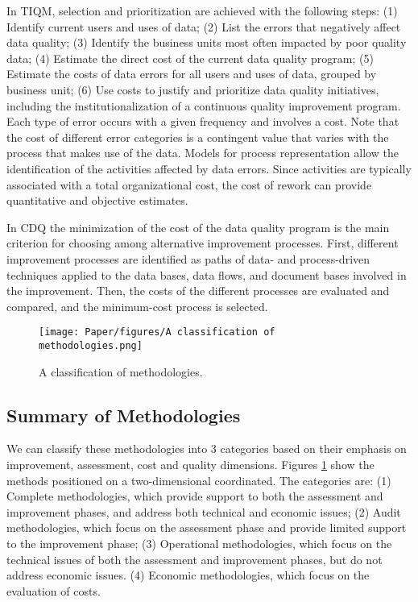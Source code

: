 \documentclass[pdftex,english,oribibl]{llncs}
\begin{document}
In TIQM, selection and prioritization are achieved with the following steps:
(1) Identify current users and uses of data;
(2) List the errors that negatively affect data quality;
(3) Identify the business units most often impacted by poor quality data;
(4) Estimate the direct cost of the current data quality program;
(5) Estimate the costs of data errors for all users and uses of data, grouped by business unit;
(6) Use costs to justify and prioritize data quality initiatives, including the institutionalization of a continuous quality improvement program.
Each type of error occurs with a given frequency and involves a cost. Note that the cost of different error categories is a contingent value that varies with the process that makes use of the data. Models for process representation allow the identification of the activities affected by data errors. Since activities are typically associated with a total organizational cost, the cost of rework can provide quantitative and objective estimates.

In CDQ the minimization of the cost of the data quality program is the main criterion for choosing among alternative improvement processes. First, different improvement processes are identified as paths of data- and process-driven techniques applied to the data bases, data flows, and document bases involved in the improvement. Then, the costs of the different processes are evaluated and compared, and the minimum-cost
process is selected.


  \begin{figure}
    \centering
    \texttt{[image: Paper/figures/A classification of methodologies.png]}
    \caption{A classification of methodologies.}
    \label{fig:classificationMethodologies}
  \end{figure}

\subsection{Summary of Methodologies}
We can classify these methodologies into 3 categories based on their emphasis on improvement, assessment, cost and quality dimensions. Figures \ref{fig:classificationMethodologies} show the methods positioned on a two-dimensional coordinated. The categories are:
(1) Complete methodologies, which provide support to both the assessment and improvement phases, and address both technical and economic issues;
(2) Audit methodologies, which focus on the assessment phase and provide limited support to the improvement phase;
(3) Operational methodologies, which focus on the technical issues of both the assessment and improvement phases, but do not address economic issues. (4) Economic methodologies, which focus on the evaluation of costs.
\end{document}

